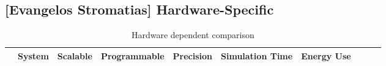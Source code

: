 \subsection{[Evangelos Stromatias] Hardware-Specific}
\label{subsec:hw}
\begin{table*}[thb!]
  \caption{Hardware dependent comparison}
  \begin{center}
      \bgroup
      \def\arraystretch{1.4}
    \begin{tabular}{l | c c c c c c c c c}
      $ $ & 
       \begin{minipage}{2.0cm}\centering System \end{minipage} & 
       \begin{minipage}{2.0cm}\centering Scalable \end{minipage} & 
       \begin{minipage}{2.0cm}\centering Programmable \end{minipage} & 
       \begin{minipage}{2.0cm}\centering Precision \end{minipage} &  
       \begin{minipage}{2.0cm}\centering Simulation Time \end{minipage} & 
       \begin{minipage}{2.0cm}\centering Energy Use \end{minipage} & 
	   \\
       \hline

\end{tabular}
\end{center}
\end{table*}
